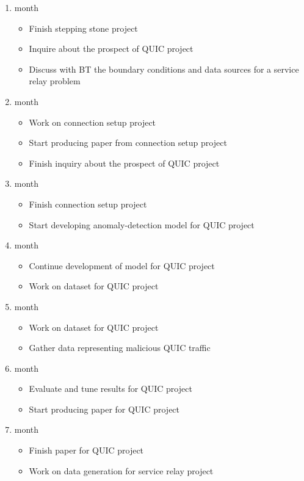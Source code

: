 \documentclass[a4paper,12pt,twoside]{article}
\begin{document}
\begin{enumerate}

\item month
\begin{itemize}
\item Finish stepping stone project
\item Inquire about the prospect of QUIC project
\item Discuss with BT the boundary conditions and data sources for a service relay problem 
\end{itemize}

\item month
\begin{itemize}
\item Work on connection setup project
\item Start producing paper from connection setup project
\item Finish inquiry about the prospect of QUIC project
\end{itemize}

\item month
\begin{itemize}
\item Finish connection setup project
\item Start developing anomaly-detection model for QUIC project
\end{itemize}

\item month
\begin{itemize}
\item Continue development of model for QUIC project
\item Work on dataset for QUIC project
\end{itemize}

\item month
\begin{itemize}
\item Work on dataset for QUIC project
\item Gather data representing malicious QUIC traffic
\end{itemize}

\item month
\begin{itemize}
\item Evaluate and tune results for QUIC project
\item Start producing paper for QUIC project
\end{itemize}

\item month
\begin{itemize}
\item Finish paper for QUIC project
\item Work on data generation for service relay project
\end{itemize}


\end{enumerate}
\end{document}
